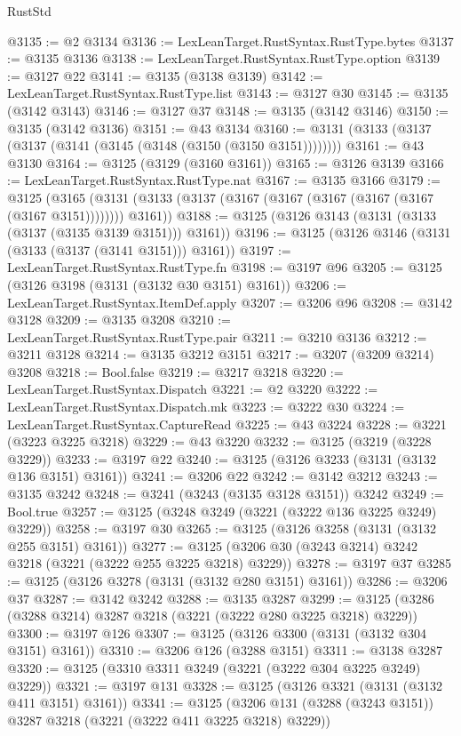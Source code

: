 \begin{lexlean}{RustStd}
\begin{coremodule}
@3135 := @2 @3134
@3136 := LexLeanTarget.RustSyntax.RustType.bytes
@3137 := @3135 @3136
@3138 := LexLeanTarget.RustSyntax.RustType.option
@3139 := @3127 @22
@3141 := @3135 (@3138 @3139)
@3142 := LexLeanTarget.RustSyntax.RustType.list
@3143 := @3127 @30
@3145 := @3135 (@3142 @3143)
@3146 := @3127 @37
@3148 := @3135 (@3142 @3146)
@3150 := @3135 (@3142 @3136)
@3151 := @43 @3134
@3160 := @3131 (@3133 (@3137 (@3137 (@3141 (@3145 (@3148 (@3150 (@3150 @3151))))))))
@3161 := @43 @3130
@3164 := @3125 (@3129 (@3160 @3161))
@3165 := @3126 @3139
@3166 := LexLeanTarget.RustSyntax.RustType.nat
@3167 := @3135 @3166
@3179 := @3125
    (@3165 (@3131 (@3133 (@3137 (@3167 (@3167 (@3167 (@3167 (@3167 (@3167 @3151)))))))) @3161))
@3188 := @3125 (@3126 @3143 (@3131 (@3133 (@3137 (@3135 @3139 @3151))) @3161))
@3196 := @3125 (@3126 @3146 (@3131 (@3133 (@3137 (@3141 @3151))) @3161))
@3197 := LexLeanTarget.RustSyntax.RustType.fn
@3198 := @3197 @96
@3205 := @3125 (@3126 @3198 (@3131 (@3132 @30 @3151) @3161))
@3206 := LexLeanTarget.RustSyntax.ItemDef.apply
@3207 := @3206 @96
@3208 := @3142 @3128
@3209 := @3135 @3208
@3210 := LexLeanTarget.RustSyntax.RustType.pair
@3211 := @3210 @3136
@3212 := @3211 @3128
@3214 := @3135 @3212 @3151
@3217 := @3207 (@3209 @3214) @3208
@3218 := Bool.false
@3219 := @3217 @3218
@3220 := LexLeanTarget.RustSyntax.Dispatch
@3221 := @2 @3220
@3222 := LexLeanTarget.RustSyntax.Dispatch.mk
@3223 := @3222 @30
@3224 := LexLeanTarget.RustSyntax.CaptureRead
@3225 := @43 @3224
@3228 := @3221 (@3223 @3225 @3218)
@3229 := @43 @3220
@3232 := @3125 (@3219 (@3228 @3229))
@3233 := @3197 @22
@3240 := @3125 (@3126 @3233 (@3131 (@3132 @136 @3151) @3161))
@3241 := @3206 @22
@3242 := @3142 @3212
@3243 := @3135 @3242
@3248 := @3241 (@3243 (@3135 @3128 @3151)) @3242
@3249 := Bool.true
@3257 := @3125 (@3248 @3249 (@3221 (@3222 @136 @3225 @3249) @3229))
@3258 := @3197 @30
@3265 := @3125 (@3126 @3258 (@3131 (@3132 @255 @3151) @3161))
@3277 := @3125 (@3206 @30 (@3243 @3214) @3242 @3218 (@3221 (@3222 @255 @3225 @3218) @3229))
@3278 := @3197 @37
@3285 := @3125 (@3126 @3278 (@3131 (@3132 @280 @3151) @3161))
@3286 := @3206 @37
@3287 := @3142 @3242
@3288 := @3135 @3287
@3299 := @3125 (@3286 (@3288 @3214) @3287 @3218 (@3221 (@3222 @280 @3225 @3218) @3229))
@3300 := @3197 @126
@3307 := @3125 (@3126 @3300 (@3131 (@3132 @304 @3151) @3161))
@3310 := @3206 @126 (@3288 @3151)
@3311 := @3138 @3287
@3320 := @3125 (@3310 @3311 @3249 (@3221 (@3222 @304 @3225 @3249) @3229))
@3321 := @3197 @131
@3328 := @3125 (@3126 @3321 (@3131 (@3132 @411 @3151) @3161))
@3341 := @3125 (@3206 @131 (@3288 (@3243 @3151)) @3287 @3218 (@3221 (@3222 @411 @3225 @3218) @3229))

\end{coremodule}
\end{lexlean}
